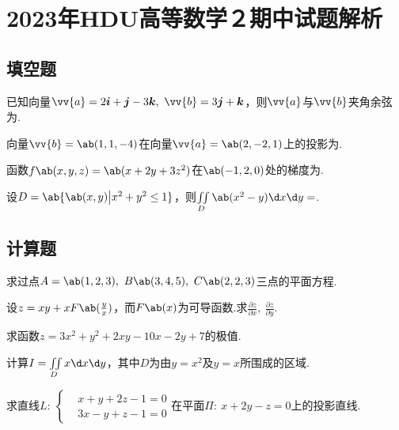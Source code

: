 \chapter{2023年HDU高等数学２期中试题解析}
\section{填空题}
\begin{exercise}
    已知向量$\vv{a}=2\boldsymbol{i}+\boldsymbol{j}-3\boldsymbol{k},\ \vv{b}=3\boldsymbol{j}+\boldsymbol{k}$，则$\vv{a}$与$\vv{b}$夹角余弦为.
\end{exercise}

\begin{exercise}
    向量$\vv{b}=\ab(1,1,-4)$在向量$\vv{a}=\ab(2,-2,1)$上的投影为.
\end{exercise}

\begin{exercise}
    函数$f\ab(x,y,z)=\ab(x+2y+3z^2)$在$\ab(-1,2,0)$处的梯度为.
\end{exercise}

\begin{exercise}
    设$D=\ab{\ab(x,y)\big|x^2+y^2\le1}$，则$\iint\limits_D{\ab(x^2-y)\d x\d y}=$.
\end{exercise}
\section{计算题}
\begin{exercise}
    求过点$A=\ab(1,2,3),\ B\ab(3,4,5),\ C\ab(2,2,3)$三点的平面方程.
\end{exercise}

\begin{exercise}
    设$z=xy+xF\ab(\frac{y}{x})$，而$F\ab(x)$为可导函数.求$\frac{\partial z}{\partial x},\ \frac{\partial z}{\partial y}$.
\end{exercise}

\begin{exercise}
    求函数$z=3x^2+y^2+2xy-10x-2y+7$的极值.
\end{exercise}

\begin{exercise}
    计算$I=\iint\limits_{D}{x\d x\d y}$，其中$D$为由$y=x^2$及$y=x$所围成的区域.
\end{exercise}

\begin{exercise}
    求直线$L:\ 
    \left\{
        \begin{aligned}
            &x+y+2z-1=0\\
            &3x-y+z-1=0
        \end{aligned}
    \right.
    $在平面$\Pi:\ x+2y-z=0$上的投影直线.
\end{exercise}

